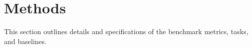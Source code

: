 
\section*{Methods}
\label{sec:methods}


This section outlines details and specifications of the benchmark metrics, tasks, and baselines.













